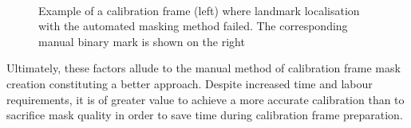 \begin{figure}[htbp]
    \centering
    \\[1mm]
    \caption{Example of a calibration frame (left) where landmark localisation with the automated
    masking method failed. The corresponding manual binary mark is shown on the right}
    \label{fig:15m_frame}
\end{figure}

Ultimately, these factors allude to the manual method of calibration frame mask creation
constituting a better approach.
Despite increased time and labour requirements, it is of greater value to achieve a
more accurate calibration than to sacrifice mask quality in order to save time during
calibration frame preparation.